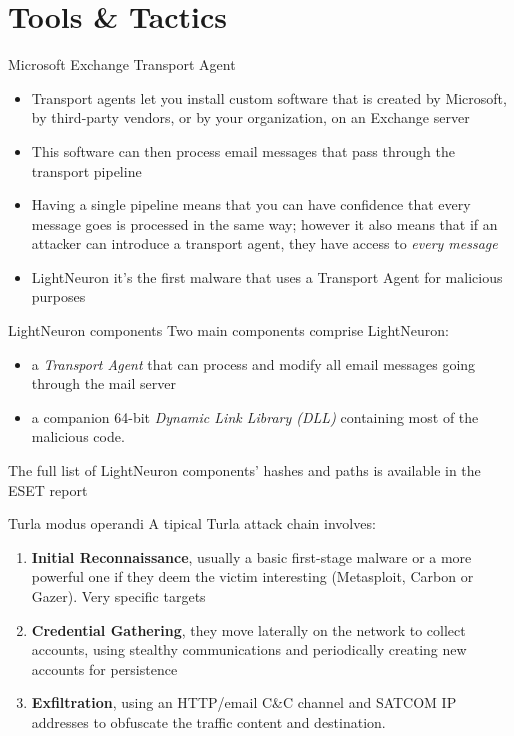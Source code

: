 \section{Tools \& Tactics}

\begin{frame}[fragile]{Microsoft Exchange Transport Agent}
    \begin{itemize}
        \item Transport agents let you install custom software that is created by Microsoft, by third-party vendors, or by your organization, on an Exchange server \cite{transMicro}
        \item This software can then process email messages that pass through the transport pipeline
        \item Having a single pipeline means that you can have confidence that every message goes is processed in the same way; however it also means that if an attacker can introduce a transport agent, they have access to \emph{every message}
        \item LightNeuron it's the first malware that uses a Transport Agent for malicious purposes
    \end{itemize}
\end{frame}

\begin{frame}[fragile]{LightNeuron components}
    Two main components comprise LightNeuron: 
    \begin{itemize}
        \item a \emph{Transport Agent} that can process and modify all email messages going through the mail server 
        \item a companion 64-bit \emph{Dynamic Link Library (DLL)} containing most of the malicious code.
    \end{itemize}
    The full list of LightNeuron components' hashes and paths is available in the ESET report \cite{Turla19}
\end{frame}


\begin{frame}[fragile]{Turla modus operandi}
    A tipical Turla attack chain involves:
    \begin{enumerate}
        \item \textbf{Initial Reconnaissance}, usually a basic first-stage malware or a more powerful one if they deem the victim interesting (Metasploit, Carbon or Gazer). Very specific targets
        \item \textbf{Credential Gathering}, they move laterally on the network to collect accounts, using stealthy communications and periodically creating new accounts for persistence
        \item \textbf{Exfiltration}, using an HTTP/email C\&C channel and SATCOM IP addresses to obfuscate the traffic content and destination. 
    \end{enumerate}
    
\end{frame}

